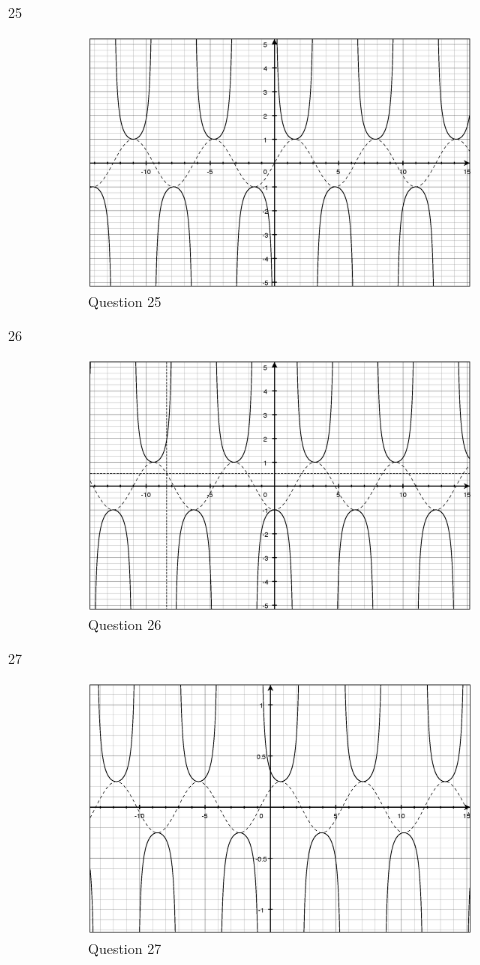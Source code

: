 \documentclass[fleqn,addpoints]{exam}
\begin{document}
\begin{description}
\item[25]
\begin{figure}[H]
  \centering
  \includegraphics[scale=.3]{question_4.6_25.eps}
  \caption*{Question 25}
\end{figure}

\item[26]
\begin{figure}[H]
  \centering
  \includegraphics[scale=.3]{question_4.6_26.eps}
  \caption*{Question 26}
\end{figure}

\item[27]
\begin{figure}[H]
  \centering
  \includegraphics[scale=.3]{question_4.6_27.eps}
  \caption*{Question 27}
\end{figure}


\end{description}
\end{document}
